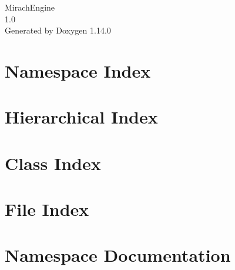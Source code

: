 \documentclass[twoside]{book}
\newcommand{\+}{\discretionary{\mbox{\scriptsize$\hookleftarrow$}}{}{}}
\newcommand{\clearemptydoublepage}{%
    \newpage{\pagestyle{empty}\cleardoublepage}%
  }
\begin{document}
  \raggedbottom
    \hypersetup{pageanchor=false,
                bookmarksnumbered=true,
                pdfencoding=unicode
               }
  \begin{titlepage}
  \vspace*{7cm}
  \begin{center}%
  {\Large Mirach\+Engine}\\
  [1ex]\large 1.\+0 \\
  \vspace*{1cm}
  {\large Generated by Doxygen 1.14.0}\\
  \end{center}
  \end{titlepage}
  \clearemptydoublepage
  \tableofcontents
  \clearemptydoublepage
  \hypersetup{pageanchor=true}
\chapter{Namespace Index}

\chapter{Hierarchical Index}

\chapter{Class Index}

\chapter{File Index}

\chapter{Namespace Documentation}







\end{document}
